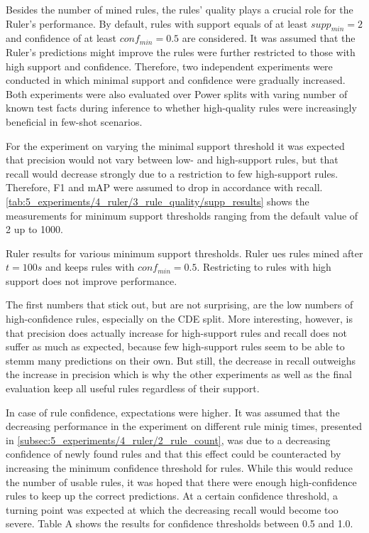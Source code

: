 Besides the number of mined rules, the rules' quality plays a crucial role for the Ruler's performance. By default, rules with support equals of at least $supp_{min} = 2$ and confidence of at least $conf_{min} = 0.5$ are considered. It was assumed that the Ruler's predictions might improve the rules were further restricted to those with high support and confidence. Therefore, two independent experiments were conducted in which minimal support and confidence were gradually increased. Both experiments were also evaluated over Power splits with varing number of known test facts during inference to whether high-quality rules were increasingly beneficial in few-shot scenarios.

For the experiment on varying the minimal support threshold it was expected that precision would not vary between low- and high-support rules, but that recall would decrease strongly due to a restriction to few high-support rules. Therefore, F1 and mAP were assumed to drop in accordance with recall. \autoref{tab:5_experiments/4_ruler/3_rule_quality/supp_results} shows the measurements for minimum support thresholds ranging from the default value of 2 up to 1000.

\begin{table}
    \centering
    
    \caption{Ruler results for various minimum support thresholds. Ruler ues rules mined after $t = 100s$ and keeps rules with $conf_{min} = 0.5$. Restricting to rules with high support does not improve performance.}
    \label{tab:5_experiments/4_ruler/3_rule_quality/supp_results}
\end{table}

The first numbers that stick out, but are not surprising, are the low numbers of high-confidence rules, especially on the CDE split. More interesting, however, is that precision does actually increase for high-support rules and recall does not suffer as much as expected, because few high-support rules seem to be able to stemm many predictions on their own. But still, the decrease in recall outweighs the increase in precision which is why the other experiments as well as the final evaluation keep all useful rules regardless of their support.

In case of rule confidence, expectations were higher. It was assumed that the decreasing performance in the experiment on different rule minig times, presented in \autoref{subsec:5_experiments/4_ruler/2_rule_count}, was due to a decreasing confidence of newly found rules and that this effect could be counteracted by increasing the minimum confidence threshold for rules. While this would reduce the number of usable rules, it was hoped that there were enough high-confidence rules to keep up the correct predictions. At a certain confidence threshold, a turning point was expected at which the decreasing recall would become too severe. Table A shows the results for confidence thresholds between 0.5 and 1.0.

